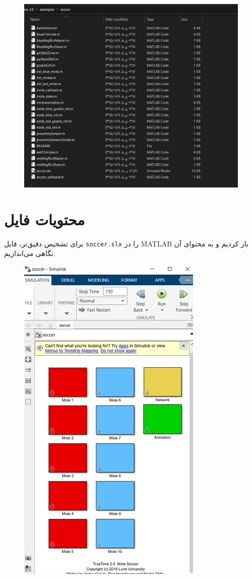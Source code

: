 \begin{figure}[H]
	\centering
	\includegraphics{2.jpg}
	\label{fig:label4}
\end{figure}

\newpage

\section*{محتویات فایل }

برای تشخیص دقیق‌تر، فایل \texttt{soccer.slx} را در MATLAB باز کردیم و به محتوای آن نگاهی می‌اندازیم.

\begin{figure}[H]
	\centering
	\includegraphics{4.jpg}
	\label{fig:label4}
\end{figure}

